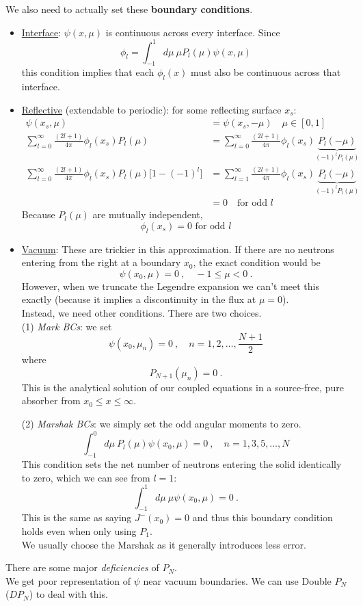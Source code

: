\documentclass[12pt]{article}
\begin{document}
We also need to actually set these \textbf{boundary conditions}.
\begin{itemize}
\item \underline{Interface}: $\psi(x,\mu)$ is continuous across every interface. Since
\[
\phi_l = \int_{-1}^1 d\mu\: \mu P_{l}(\mu)\psi(x,\mu)
\]
this condition implies that each $\phi_l(x)$ must also be continuous across that interface. 

\item \underline{Reflective} (extendable to periodic): for some reflecting surface $x_s$:
\begin{align*}
\psi(x_s,\mu) &= \psi(x_s,-\mu) \quad \mu \in [0,1]\\
\sum_{l=0}^{\infty} \frac{(2l+1)}{4\pi}\phi_l(x_s)P_l(\mu) &= \sum_{l=0}^{\infty} \frac{(2l+1)}{4\pi}\phi_l(x_s)\underbrace{P_l(-\mu)}_{(-1)^l P_l(\mu)}\\
\sum_{l=0}^{\infty} \frac{(2l+1)}{4\pi}\phi_l(x_s)P_l(\mu)\bigl[1 - (-1)^l\bigr] &= \sum_{l=1}^{\infty} \frac{(2l+1)}{4\pi}\phi_l(x_s)\underbrace{P_l(-\mu)}_{(-1)^l P_l(\mu)}\\
&= 0 \quad \text{for odd }l
\end{align*}
Because $P_l(\mu)$ are mutually independent, 
\[\boxed{\phi_l(x_s) =0\text{ for odd }l}\]

\item \underline{Vacuum}: These are trickier in this approximation. If there are no neutrons entering from the right at a boundary $x_0$, the exact condition would be
\[
\psi(x_0, \mu) = 0\:, \quad -1 \leq \mu < 0\:.
\]
However, when we truncate the Legendre expansion we can't meet this exactly (because it implies a discontinuity in the flux at $\mu=0$).\\
Instead, we need other conditions. There are two choices.\\
(1) \textit{Mark BCs}: we set
\[
\psi(x_0, \mu_n) = 0\:, \quad n = 1, 2, \dots, \frac{N+1}{2}
\]
where 
\[
P_{N+1}(\mu_n) = 0\:.
\]
This is the analytical solution of our coupled equations in a source-free, pure absorber from $x_0 \leq x \leq \infty$.

(2) \textit{Marshak BCs}: we simply set the odd angular moments to zero. 
\[
\int_{-1}^0 d\mu\: P_{l}(\mu)\psi(x_0,\mu) = 0\:, \quad n = 1, 3, 5, \dots, N
\]
This condition sets the net number of neutrons entering the solid identically to zero, which we can see from $l=1$:
\[
\int_{-1}^1 d\mu\: \mu \psi(x_0,\mu) = 0\:.
\]
This is the same as saying $J^-(x_0) = 0$ and thus this boundary condition holds even when only using $P_1$. \\
We usually choose the Marshak as it generally introduces less error.  
\end{itemize}

There are some major \textit{deficiencies} of $P_N$. \\
We get poor representation of $\psi$ near vacuum boundaries. We can use Double $P_N$ ($DP_N$) to deal with this.\\
\end{document}
